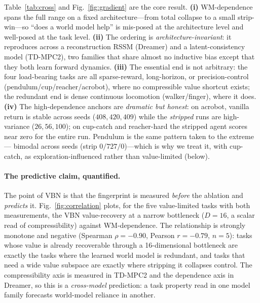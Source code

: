 \documentclass[twocolumn,10pt]{article}
\begin{document}
Table~\ref{tab:cross} and Fig.~\ref{fig:gradient} are the core result.
\textbf{(i)} WM-dependence spans the full range on a fixed architecture---from
total collapse to a small strip-win---so ``does a world model help'' is
mis-posed at the architecture level and well-posed at the task level.
\textbf{(ii)} The ordering is \emph{architecture-invariant}: it reproduces
across a reconstruction RSSM (Dreamer) and a latent-consistency model
(TD-MPC2), two families that share almost no inductive bias except that they
both learn forward dynamics. \textbf{(iii)} The essential end is not arbitrary:
the four load-bearing tasks are all sparse-reward, long-horizon, or
precision-control (pendulum/cup/reacher/acrobot), where no compressible value
shortcut exists; the redundant end is dense continuous locomotion
(walker/finger), where it does. \textbf{(iv)} The high-dependence anchors are
\emph{dramatic but honest}: on acrobot, vanilla return is stable across seeds
($408,420,409$) while the \emph{stripped} runs are high-variance
($26,56,100$); on cup-catch and reacher-hard the stripped agent scores near
zero for the entire run. Pendulum is the same pattern taken to the extreme---
bimodal across seeds (strip $0/727/0$)---which is why we treat it, with
cup-catch, as exploration-influenced rather than value-limited (below).

\paragraph{The predictive claim, quantified.}
The point of VBN is that the fingerprint is measured \emph{before} the
ablation and \emph{predicts} it. Fig.~\ref{fig:correlation} plots, for the five
value-limited tasks with both measurements, the VBN value-recovery at a narrow
bottleneck ($D{=}16$, a scalar read of compressibility) against WM-dependence.
The relationship is strongly monotone and negative (Spearman
$\rho{=}{-}0.90$, Pearson $r{=}{-}0.79$, $n{=}5$): tasks whose value is already
recoverable through a 16-dimensional bottleneck are exactly the tasks where the
learned world model is redundant, and tasks that need a wide value subspace are
exactly where stripping it collapses control. The compressibility axis is
measured in TD-MPC2 and the dependence axis in Dreamer, so this is a
\emph{cross-model} prediction: a task property read in one model family
forecasts world-model reliance in another.
\end{document}
